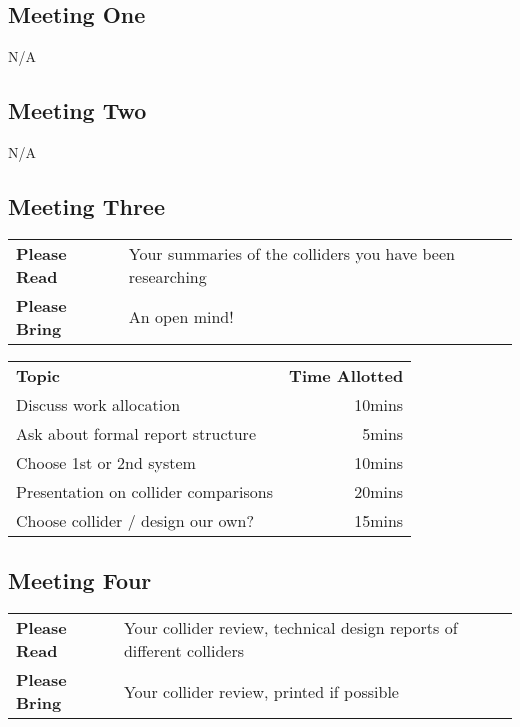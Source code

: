 \subsection{Meeting One}
N/A
\subsection{Meeting Two}

N/A

\subsection{Meeting Three}

\begin{tabularx}{\textwidth}{l X}
  \textbf{Please Read} & Your summaries of the colliders you have been researching \\
  \textbf{Please Bring} & An open mind! \\
\end{tabularx}

\vspace{5mm}

\begin{tabularx}{\textwidth}{X r}
  \textbf{Topic} & \textbf{Time Allotted} \\
  Discuss work allocation & 
10mins \\
 
Ask about formal report structure &
5mins \\
 
Choose 1st or 2nd system &
10mins \\
 
Presentation on collider comparisons &
20mins \\
 
Choose collider / design our own? &
15mins \\
\end{tabularx}

\subsection{Meeting Four}

\begin{tabularx}{\textwidth}{l X}
  \textbf{Please Read} & Your collider review, technical design reports of different colliders \\
  \textbf{Please Bring} & Your collider review, printed if possible \\
\end{tabularx}

